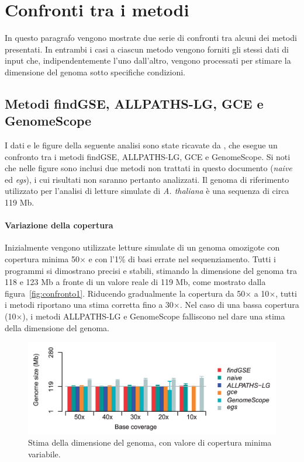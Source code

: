 \documentclass[crop=false, class=book]{standalone}
\begin{document}
	
	\section{Confronti tra i metodi}
	In questo paragrafo vengono mostrate due serie di confronti tra alcuni dei metodi presentati. In entrambi i casi a ciascun metodo vengono forniti gli stessi dati di input che, indipendentemente l'uno dall'altro, vengono processati per stimare la dimensione del genoma sotto specifiche condizioni.
	
	\subsection{Metodi findGSE, ALLPATHS-LG, GCE e GenomeScope}
	I dati e le figure della seguente analisi sono state ricavate da \cite{sun2017findGSE}, che esegue un confronto tra i metodi findGSE, ALLPATHS-LG, GCE e GenomeScope.
	Si noti che nelle figure sono inclusi due metodi non trattati in questo documento (\textit{naive} ed \textit{egs}), i cui risultati non saranno pertanto analizzati.
	Il genoma di riferimento utilizzato per l'analisi di letture simulate di \textit{A. thaliana} è una sequenza di circa 119 Mb. 
	
	\paragraph{Variazione della copertura}
	Inizialmente vengono utilizzate letture simulate di un genoma omozigote con copertura minima 50$\times$ e con l'1\% di basi errate nel sequenziamento. Tutti i programmi si dimostrano precisi e stabili, stimando la dimensione del genoma tra 118 e 123 Mb a fronte di un valore reale di 119 Mb, come mostrato dalla figura~\vref{fig:confronto1}. Riducendo gradualmente la copertura da 50$\times$ a 10$\times$, tutti i metodi riportano una stima corretta fino a 30$\times$. Nel caso di una bassa copertura (10$\times$), i metodi ALLPATHS-LG e GenomeScope falliscono nel dare una stima della dimensione del genoma.
	
	\begin{figure}[h]
		\centering
		\includegraphics[height=0.21\textheight]{capitoli/analisi/confronto/confronto1/a.png}
		\caption{Stima della dimensione del genoma, con valore di copertura minima variabile.}
		\label{fig:confronto1}
	\end{figure}
\end{document}
